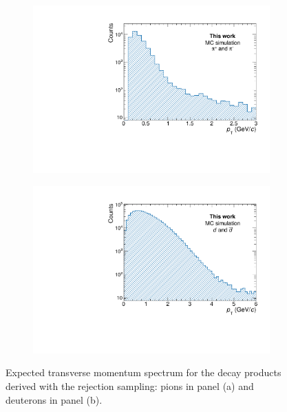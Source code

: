 \begin{figure}[htb]
\begin{subfigure}{.5\textwidth}
  \centering
  \captionsetup{justification=centering}
  \includegraphics[width=\linewidth]{gfx/pi_spectrum}
  \caption{}
  \label{fig:pi_spectrum}
\end{subfigure}%
\begin{subfigure}{.5\textwidth}
  \centering
  \captionsetup{justification=centering}
  \includegraphics[width=\linewidth]{gfx/deu_spectrum}
  \caption{}
  \label{fig:deu_spectrum}
\end{subfigure}
\caption{Expected transverse momentum spectrum for the \ds decay products derived with the rejection sampling: pions in panel (a) and deuterons in panel (b).}
\label{fig:BW_spec_prod}
\end{figure}

